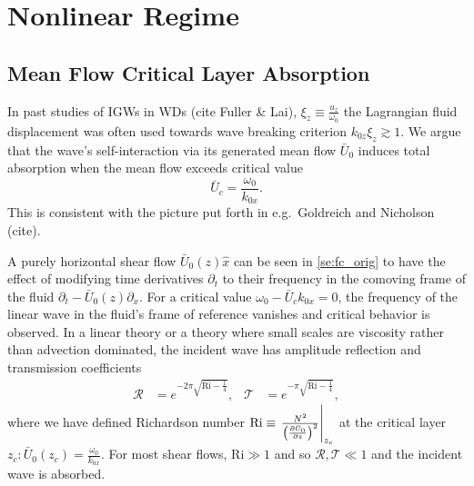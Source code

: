 \documentclass[twocolumn,
        nofootinbib,
        usenames, %
        dvipsnames %
    ]{revtex4-1}%
\newcommand*{\pd}[2]{\frac{\partial#1}{\partial#2}}
\newcommand*{\at}[1]{\left.#1\right|}
\DeclarePairedDelimiter\p{\lparen}{\rparen}
\begin{document}
\section{Nonlinear Regime}\label{s:nonlin}

\subsection{Mean Flow Critical Layer Absorption}

In past studies of IGWs in WDs (cite Fuller \& Lai), $\xi_z \equiv
\frac{u_z}{\omega_0}$ the Lagrangian fluid displacement was often used towards
wave breaking criterion $k_{0z}\xi_z \gtrsim 1$. We argue that the wave's
self-interaction via its generated mean flow $\bar{U}_0$ induces total
absorption when the mean flow exceeds critical value
\begin{equation}
    \bar{U}_c = \frac{\omega_0}{k_{0x}}.
\end{equation}
This is consistent with the picture put forth in e.g.\ Goldreich and Nicholson
(cite).

A purely horizontal shear flow $\bar{U}_0(z) \hat{x}$ can be seen in
\autoref{se:fc_orig} to have the effect of modifying time derivatives
$\partial_t$ to their frequency in the comoving frame of the fluid $\partial_t -
\bar{U}_0(z)\partial_x$. For a critical value $\omega_0 - \bar{U}_c k_{0x} = 0$,
the frequency of the linear wave in the fluid's frame of reference vanishes and
critical behavior is observed. In a linear theory or a theory where small scales
are viscosity rather than advection dominated, the incident wave has amplitude
reflection and transmission coefficients
\begin{align}
    \mathcal{R} &= e^{-2\pi \sqrt{\mathrm{Ri} - \frac{1}{4}}}, &
    \mathcal{T} &= e^{-\pi \sqrt{\mathrm{Ri} - \frac{1}{4}}},
    \label{eq:crit_coeffs}
\end{align}
where we have defined Richardson number $\mathrm{Ri} \equiv
\at{\frac{N^2}{\p*{\pd{\bar{U}_0}{z}}^2}}_{z_c}$ at the critical layer $z_c:
\bar{U}_0(z_c) = \frac{\omega_0}{k_{0x}}$. For most shear flows, $\mathrm{Ri}
\gg 1$ and so $\mathcal{R}, \mathcal{T} \ll 1$ and the incident wave is
absorbed.
\end{document}
